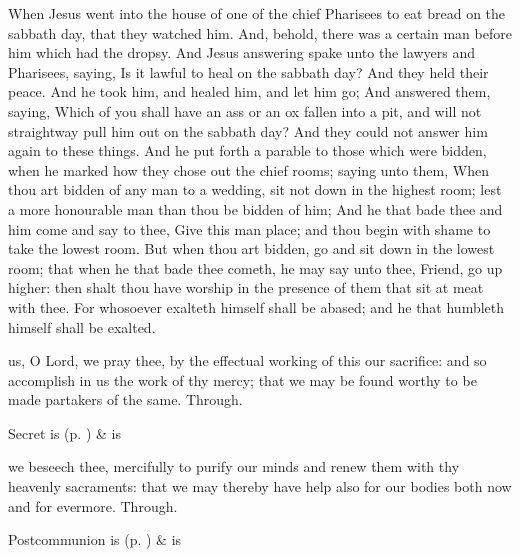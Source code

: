  When Jesus went into the house of one of the chief Pharisees to eat bread on the sabbath day, that they watched him. And, behold, there was a certain man before him which had the dropsy. And Jesus answering spake unto the lawyers and Pharisees, saying, Is it lawful to heal on the sabbath day? And they held their peace. And he took him, and healed him, and let him go; And answered them, saying, Which of you shall have an ass or an ox fallen into a pit, and will not straightway pull him out on the sabbath day? And they could not answer him again to these things. And he put forth a parable to those which were bidden, when he marked how they chose out the chief rooms; saying unto them, When thou art bidden of any man to a wedding, sit not down in the highest room; lest a more honourable man than thou be bidden of him; And he that bade thee and him come and say to thee, Give this man place; and thou begin with shame to take the lowest room. But when thou art bidden, go and sit down in the lowest room; that when he that bade thee cometh, he may say unto thee, Friend, go up higher: then shalt thou have worship in the presence of them that sit at meat with thee. For whosoever exalteth himself shall be abased; and he that humbleth himself shall be exalted.


\secret
{} us, O Lord, we pray thee, by the effectual working of this our sacrifice: and so accomplish in us the work of thy mercy; that we may be found worthy to be made partakers of the same. Through.
\begin{rubric}
     Secret is  (p. \pageref{SPSaints}) \&  is 
\end{rubric}

\postcommunion
{} we beseech thee, mercifully to purify our minds and renew them with thy heavenly sacraments: that we may thereby have help also for our bodies both now and for evermore. Through.
\begin{rubric}
     Postcommunion is  (p. \pageref{SPSaints}) \&  is 
\end{rubric}


